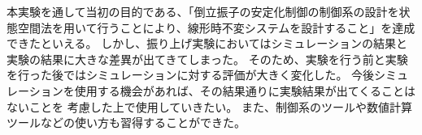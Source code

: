 本実験を通して当初の目的である、「倒立振子の安定化制御の制御系の設計を状態空間法を用いて行うことにより、線形時不変システムを設計すること」を達成できたといえる。
しかし、振り上げ実験においてはシミュレーションの結果と実験の結果に大きな差異が出てきてしまった。
そのため、実験を行う前と実験を行った後ではシミュレーションに対する評価が大きく変化した。
今後シミュレーションを使用する機会があれば、その結果通りに実験結果が出てくることはないことを
考慮した上で使用していきたい。
また、制御系のツールや数値計算ツールなどの使い方も習得することができた。